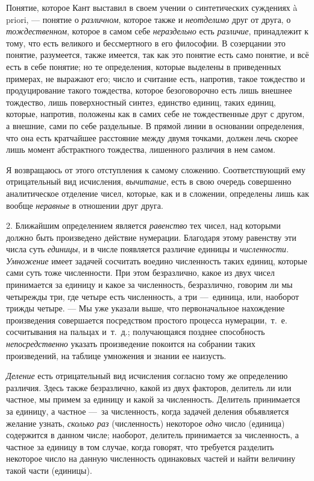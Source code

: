 {Понятие, которое Кант выставил в своем учении о синтетических суждениях à
priori, — понятие о {\em различном}, которое также и
{\em неотделимо} друг от друга, о
{\em тождественном}, которое в самом себе
{\em нераздельно} есть
{\em различие}, принадлежит к тому, что есть великого и
бессмертного в его философии. В созерцании это понятие, разумеется, также
имеется, так как это понятие есть само понятие, и всё есть в себе понятие;
но те определения, которые выделены в приведенных примерах, не выражают
его; число и считание есть, напротив, такое тождество и продуцирование
такого тождества, которое безоговорочно есть лишь внешнее тождество, лишь
поверхностный синтез, единство единиц, таких единиц, которые, напротив,
положены как в самих себе не тождественные друг с другом, а внешние, сами
по себе раздельные. В прямой линии в основании определения, что она есть
кратчайшее расстояние между двумя точками, должен лечь скорее лишь момент
абстрактного тождества, лишенного различия в нем самом.

Я возвращаюсь от этого отступления к самому сложению. Соответствующий ему
отрицательный вид исчисления, {\em вычитание}, есть в
свою очередь совершенно аналитическое отделение чисел, которые, как и в
сложении, определены лишь как вообще {\em неравные} в
отношении друг друга.

2. Ближайшим определением является {\em равенство} тех
чисел, над которыми должно быть произведено действие нумерации. Благодаря
этому равенству эти числа суть {\em единицы}, и в числе
появляется различие единицы и {\em численности}.
{\em Умножение} имеет задачей сосчитать воедино
численность таких единиц, которые сами суть тоже численности. При этом
безразлично, какое из двух чисел принимается за единицу и какое за
численность, безразлично, говорим ли мы четырежды три, где четыре есть
численность, а три —~единица, или, наоборот трижды четыре. — Мы уже указали
выше, что первоначальное нахождение произведения совершается посредством
простого процесса нумерации,~т.~е. сосчитывания на пальцах и~т.~д.;
получающаяся позднее способность {\em непосредственно}
указать произведение покоится на собрании таких произведений, на таблице
умножения и знании ее наизусть.

{\em Деление} есть отрицательный вид исчисления согласно
тому же определению различия. Здесь также безразлично, какой из двух
факторов, делитель ли или частное, мы примем за единицу и какой за
численность. Делитель принимается за единицу, а частное —~за численность,
когда задачей деления объявляется желание узнать,
{\em сколько раз} (численность) некоторое
{\em одно} число (единица) содержится в данном числе;
наоборот, делитель принимается за численность, а частное за единицу в том
случае, когда говорят, что требуется разделить некоторое число на данную
численность одинаковых частей и найти величину такой части (единицы).

}

